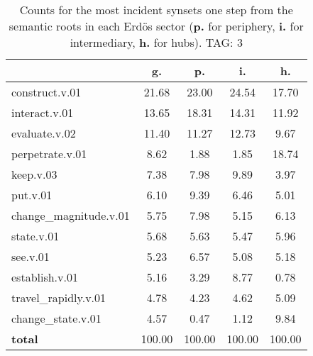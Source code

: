 \begin{table}[h!]
\begin{center}
\begin{tabular}{| l || c | c | c | c |}\hline
 & {\bf g.} & {\bf p.} & {\bf i.} & {\bf h.} \\\hline\hline
construct.v.01 & 21.68  & 23.00  & 24.54  & 17.70 \\\hline
interact.v.01 & 13.65  & 18.31  & 14.31  & 11.92 \\\hline
evaluate.v.02 & 11.40  & 11.27  & 12.73  & 9.67 \\\hline
perpetrate.v.01 & 8.62  & 1.88  & 1.85  & 18.74 \\\hline
keep.v.03 & 7.38  & 7.98  & 9.89  & 3.97 \\\hline
put.v.01 & 6.10  & 9.39  & 6.46  & 5.01 \\\hline
change\_magnitude.v.01 & 5.75  & 7.98  & 5.15  & 6.13 \\\hline
state.v.01 & 5.68  & 5.63  & 5.47  & 5.96 \\\hline
see.v.01 & 5.23  & 6.57  & 5.08  & 5.18 \\\hline
establish.v.01 & 5.16  & 3.29  & 8.77  & 0.78 \\\hline
travel\_rapidly.v.01 & 4.78  & 4.23  & 4.62  & 5.09 \\\hline
change\_state.v.01 & 4.57  & 0.47  & 1.12  & 9.84 \\\hline\hline
{{\bf total}} & 100.00  & 100.00  & 100.00  & 100.00 \\\hline
\end{tabular}
\caption{Counts for the most incident synsets one step from the semantic roots in each Erd\"os sector ({\bf p.} for periphery, {\bf i.} for intermediary, {\bf h.} for hubs). TAG: 3}
\end{center}
\end{table}
